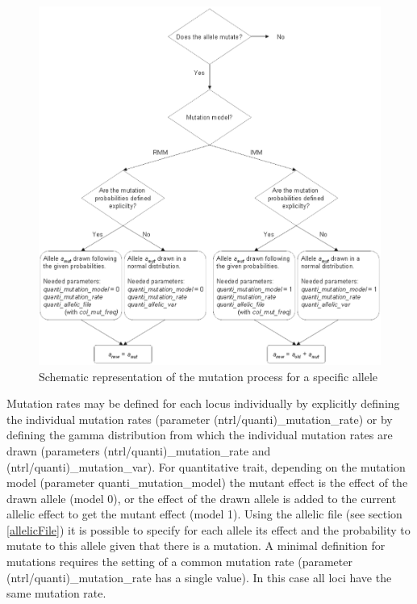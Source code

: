 \documentclass[letterpaper,12pt,oneside]{book}
\begin{document}
\begin{figure}[htbp]
	\centering
		\includegraphics[width=1\textwidth]{mutation-quanti.pdf}
	\caption{Schematic representation of the mutation process for a specific allele}
	\label{fig:mutation-quanti}
\end{figure}

Mutation rates may be defined for each locus individually by explicitly defining the individual mutation rates (parameter \textsf{(ntrl/quanti)\_mutation\_rate}) or by defining the gamma distribution from which the individual mutation rates are drawn (parameters \textsf{(ntrl/quanti)\_mutation\_rate} and \textsf{(ntrl/quanti)\_mutation\_var}). For quantitative trait, depending on the mutation model (parameter \textsf{quanti\_mutation\_model}) the mutant effect is the effect of the drawn allele (model 0), or the effect of the drawn allele is added to the current allelic effect to get the mutant effect (model 1). Using the allelic file (see section \ref{allelicFile}) it is possible to specify for each allele its effect and the probability to mutate to this allele given that there is a mutation. A minimal definition for mutations requires the setting of a common mutation rate (parameter \textsf{(ntrl/quanti)\_mutation\_rate} has a single value). In this case all loci have the same mutation rate.
\end{document}
